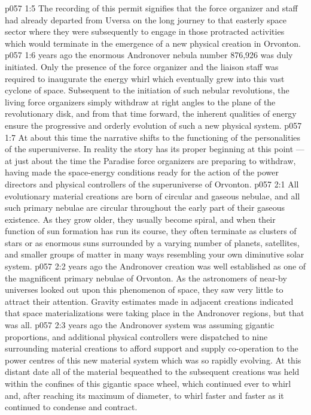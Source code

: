 \vs p057 1:5 The recording of this permit signifies that the force organizer and staff had already departed from Uversa on the long journey to that easterly space sector where they were subsequently to engage in those protracted activities which would terminate in the emergence of a new physical creation in Orvonton.
\vs p057 1:6 \pc {} years ago the enormous Andronover nebula number 876,926 was duly initiated. Only the presence of the force organizer and the liaison staff was required to inaugurate the energy whirl which eventually grew into this vast cyclone of space. Subsequent to the initiation of such nebular revolutions, the living force organizers simply withdraw at right angles to the plane of the revolutionary disk, and from that time forward, the inherent qualities of energy ensure the progressive and orderly evolution of such a new physical system.
\vs p057 1:7 At about this time the narrative shifts to the functioning of the personalities of the superuniverse. In reality the story has its proper beginning at this point --- at just about the time the Paradise force organizers are preparing to withdraw, having made the space\hyp{}energy conditions ready for the action of the power directors and physical controllers of the superuniverse of Orvonton.
\vs p057 2:1 All evolutionary material creations are born of circular and gaseous nebulae, and all such primary nebulae are circular throughout the early part of their gaseous existence. As they grow older, they usually become spiral, and when their function of sun formation has run its course, they often terminate as clusters of stars or as enormous suns surrounded by a varying number of planets, satellites, and smaller groups of matter in many ways resembling your own diminutive solar system.
\vs p057 2:2 \pc {} years ago the Andronover creation was well established as one of the magnificent primary nebulae of Orvonton. As the astronomers of near\hyp{}by universes looked out upon this phenomenon of space, they saw very little to attract their attention. Gravity estimates made in adjacent creations indicated that space materializations were taking place in the Andronover regions, but that was all.
\vs p057 2:3 \pc {} years ago the Andronover system was assuming gigantic proportions, and additional physical controllers were dispatched to nine surrounding material creations to afford support and supply co\hyp{}operation to the power centres of this new material system which was so rapidly evolving. At this distant date all of the material bequeathed to the subsequent creations was held within the confines of this gigantic space wheel, which continued ever to whirl and, after reaching its maximum of diameter, to whirl faster and faster as it continued to condense and contract.
